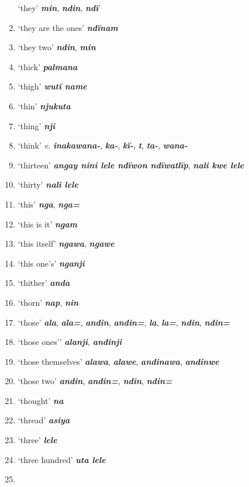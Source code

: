 \begin{enumerate}[noitemsep, label={}, align=left, widest=190, labelsep=1ex,leftmargin=*,itemindent=-10pt]
‘they’ \textbf{\textit{min}}, \textbf{\textit{ndin}}, \textbf{\textit{ndï}} \item
‘they are the ones’ \textbf{\textit{ndïnam}} \item
‘they two’ \textbf{\textit{ndin}}, \textbf{\textit{min}} \item
‘thick’ \textbf{\textit{palmana}} \item
‘thigh’ \textbf{\textit{wutï name}} \item
‘thin’ \textbf{\textit{njukuta}} \item
‘thing’ \textbf{\textit{nji}} \item
‘think’ \textit{v.} \textbf{\textit{inakawana-}}, \textbf{\textit{ka-}}, \textbf{\textit{kï-}}, \textbf{\textit{t}}, \textbf{\textit{ta-}}, \textbf{\textit{wana-}} \item
‘thirteen’ \textbf{\textit{angay nini lele ndïwon ndïwatlïp}}, \textbf{\textit{nali kwe lele}} \item
‘thirty’ \textbf{\textit{nali lele}} \item
‘this’ \textbf{\textit{nga}}, \textbf{\textit{nga=}} \item
‘this is it’ \textbf{\textit{ngam}} \item
‘this itself’ \textbf{\textit{ngawa}}, \textbf{\textit{ngawe}} \item
‘this one’s’ \textbf{\textit{nganji}} \item
‘thither’ \textbf{\textit{anda}} \item
‘thorn’ \textbf{\textit{nap}}, \textbf{\textit{nin}} \item
‘those’ \textbf{\textit{ala}}, \textbf{\textit{ala=}}, \textbf{\textit{andin}}, \textbf{\textit{andin=}}, \textbf{\textit{la}}, \textbf{\textit{la=}}, \textbf{\textit{ndin}}, \textbf{\textit{ndin=}} \item
‘those ones’’ \textbf{\textit{alanji}}, \textbf{\textit{andinji}} \item
‘those themselves’ \textbf{\textit{alawa}}, \textbf{\textit{alawe}}, \textbf{\textit{andinawa}}, \textbf{\textit{andinwe}} \item
‘those two’ \textbf{\textit{andin}}, \textbf{\textit{andin=}}, \textbf{\textit{ndin}}, \textbf{\textit{ndin=}} \item
‘thought’ \textbf{\textit{na}} \item
‘thread’ \textbf{\textit{asiya}} \item
‘three’ \textbf{\textit{lele}} \item
‘three hundred’ \textbf{\textit{uta lele}} \item

\end{enumerate}
